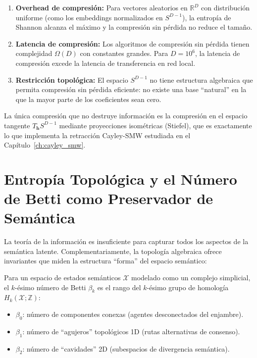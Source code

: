 \begin{enumerate}
\item \textbf{Overhead de compresión:} Para vectores aleatorios en $\mathbb{R}^D$ con
distribución uniforme (como los embeddings normalizados en $S^{D-1}$), la entropía
de Shannon alcanza el máximo y la compresión sin pérdida no reduce el tamaño.

\item \textbf{Latencia de compresión:} Los algoritmos de compresión sin pérdida
tienen complejidad $\Omega(D)$ con constantes grandes. Para $D = 10^6$, la
latencia de compresión excede la latencia de transferencia en red local.

\item \textbf{Restricción topológica:} El espacio $S^{D-1}$ no tiene estructura
algebraica que permita compresión sin pérdida eficiente: no existe una base
``natural'' en la que la mayor parte de los coeficientes sean cero.
\end{enumerate}

La única compresión que no destruye información es la compresión en el espacio
tangente $T_{\mathbf{h}} S^{D-1}$ mediante proyecciones isométricas (Stiefel),
que es exactamente lo que implementa la retracción Cayley-SMW estudiada en el
Capítulo~\ref{ch:cayley_smw}.

\section{Entropía Topológica y el Número de Betti como Preservador de Semántica}

La teoría de la información es insuficiente para capturar todos los aspectos
de la semántica latente. Complementariamente, la topología algebraica ofrece
invariantes que miden la estructura ``forma'' del espacio semántico:

\begin{definition}

Para un espacio de estados semánticos $\mathcal{X}$ modelado como un complejo
simplicial, el $k$-ésimo número de Betti $\beta_k$ es el rango del $k$-ésimo
grupo de homología $H_k(\mathcal{X}; \mathbb{Z})$:
\begin{itemize}
\item $\beta_0$: número de componentes conexas (agentes desconectados del enjambre).
\item $\beta_1$: número de ``agujeros'' topológicos 1D (rutas alternativas de consenso).
\item $\beta_2$: número de ``cavidades'' 2D (subespacios de divergencia semántica).
\end{itemize}
\end{definition}


